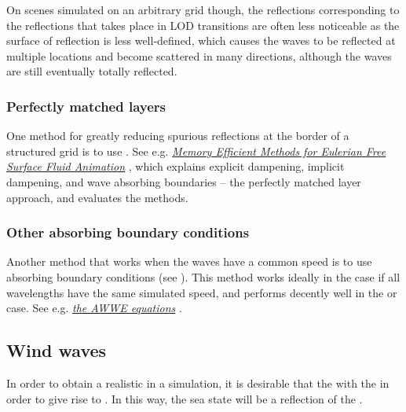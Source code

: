 On scenes simulated on an arbitrary grid though, the reflections corresponding to the reflections that takes place in LOD transitions are often less noticeable as the surface of reflection is less well-defined, which causes the waves to be reflected at multiple locations and become scattered in many directions, although the waves are still eventually totally reflected.

\subsubsection{Perfectly matched layers}

One method for greatly reducing spurious reflections at the border of a structured grid is to use . See e.g. \textit{\href{http://liu.diva-portal.org/smash/get/diva2:359805/FULLTEXT01}{Memory Efficient Methods for Eulerian Free Surface Fluid Animation}} \citep{temp}, which explains explicit dampening, implicit dampening, and wave absorbing boundaries -- the perfectly matched layer approach, and evaluates the methods.

\subsubsection{Other absorbing boundary conditions}

Another method that works when the waves have a common speed is to use absorbing boundary conditions (see \citep{temp}). This method works ideally in the  case if all wavelengths have the same simulated speed, and performs decently well in the  or  case. See e.g. \textit{\href{http://www.ce.ncsu.edu/centers/cmg/AWWE/}{the AWWE equations}} \citep{temp}.

\HRule














\subsection{Wind waves}

In order to obtain a realistic  in a simulation, it is desirable that the  \interacts with the \wind in order to give rise to . In this way, the sea state will be a reflection of the .

